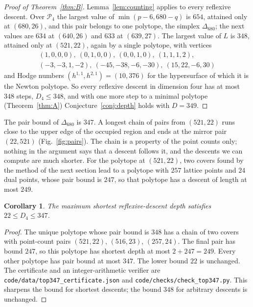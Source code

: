 \documentclass[manuscript]{aomart}
\newtheorem{corollary}[theorem]{Corollary}
\theoremstyle{definition}
\theoremstyle{remark}
\newcommand{\Dbig}{\Delta_{680}}
\newcommand{\UB}{348}
\newcommand{\UBplus}{349}
\begin{document}
\begin{proof}[Proof of Theorem~\ref{thm:B}]
Lemma~\ref{lem:counting} applies to every reflexive descent. Over
$\mathcal{P}_4$ the largest value of $\min(p-6,680-q)$ is $654$, attained
only at $(680,26)$, and this pair belongs to one polytope, the simplex
$\Dbig$; the next values are $634$ at $(640,26)$ and $633$ at $(639,27)$.
The largest value of $L$ is $348$, attained only at $(521,22)$, again by a
single polytope, with vertices
\begin{multline*}
(1,0,0,0),\ (0,1,0,0),\ (0,0,1,0),\ (1,1,1,2),\\
(-3,-3,1,-2),\ (-45,-38,-6,-30),\ (15,22,-6,30)
\end{multline*}
and Hodge numbers $(h^{1,1},h^{2,1})=(10,376)$ for the hypersurface of
which it is the Newton polytope. So every reflexive descent in dimension
four has at most $\UB$ steps, $D_4\le\UB$, and with one more step to a
minimal polytope (Theorem~\ref{thm:A}) Conjecture~\ref{conj:depth} holds
with $D=\UBplus$.
\end{proof}

The pair bound of $\Dbig$ is $347$. A longest chain of pairs from
$(521,22)$ runs close to the upper edge of the occupied region and ends at
the mirror pair $(22,521)$ (Fig.~\ref{fig:pairs}). The chain is a property
of the point counts only; nothing in the argument says that a descent
follows it, and the descents we can compute are much shorter. For the
polytope at $(521,22)$, two covers found by the method of the next section
lead to a polytope with $257$ lattice points and $24$ dual points, whose
pair bound is $247$, so that polytope has a descent of length at most
$249$.

\begin{corollary}\label{cor:347}
The maximum shortest reflexive-descent depth satisfies $22\le D_4\le347$.
\end{corollary}
\begin{proof}
The unique polytope whose pair bound is $348$ has a chain of two covers
with point-count pairs $(521,22)$, $(516,23)$, $(257,24)$. The final pair
has bound $247$, so this polytope has shortest depth at most $2+247=249$.
Every other polytope has pair bound at most $347$. The lower bound $22$
is unchanged. The certificate and an integer-arithmetic verifier are
\texttt{code/data/top347\_certificate.json} and
\texttt{code/checks/check\_top347.py}. This sharpens the bound for shortest
descents; the bound $348$ for arbitrary descents is unchanged.
\end{proof}
\end{document}

